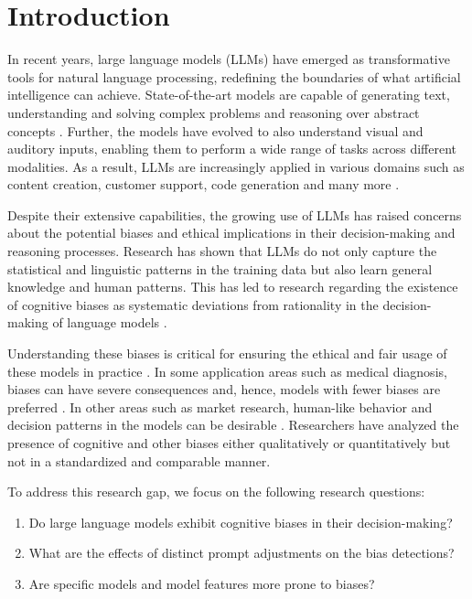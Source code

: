 \section{Introduction}
\par In recent years, large language models (LLMs) have emerged as transformative tools for natural language processing, redefining the boundaries of what artificial intelligence can achieve. State-of-the-art models are capable of generating text, understanding and solving complex problems and reasoning over abstract concepts \parencite{naveed2023comprehensive, zhao2023survey}. Further, the models have evolved to also understand visual and auditory inputs, enabling them to perform a wide range of tasks across different modalities. As a result, LLMs are increasingly applied in various domains such as content creation, customer support, code generation and many more \parencite{hadi2024large}.

\par Despite their extensive capabilities, the growing use of LLMs has raised concerns about the potential biases and ethical implications in their decision-making and reasoning processes. Research has shown that LLMs do not only capture the statistical and linguistic patterns in the training data but also learn general knowledge and human patterns. This has led to research regarding the existence of cognitive biases as systematic deviations from rationality in the decision-making of language models \parencite{tversky1974judgment, schramowski2022large}.

\par Understanding these biases is critical for ensuring the ethical and fair usage of these models in practice \parencite{echterhoff2024cognitive}. In some application areas such as medical diagnosis, biases can have severe consequences and, hence, models with fewer biases are preferred \parencite{haltaufderheide2024ethics}. In other areas such as market research, human-like behavior and decision patterns in the models can be desirable \parencite{talboy2023challenging}. Researchers have analyzed the presence of cognitive and other biases either qualitatively or quantitatively \parencite{dominguez2023questioning,echterhoff2024cognitive,talboy2023challenging} but not in a standardized and comparable manner.

\par To address this research gap, we focus on the following research questions:
\begin{enumerate}[itemsep=0pt, parsep=0pt, topsep=0pt]
    \item Do large language models exhibit cognitive biases in their decision-making?
    \item What are the effects of distinct prompt adjustments on the bias detections?
    \item Are specific models and model features more prone to biases?
\end{enumerate}

